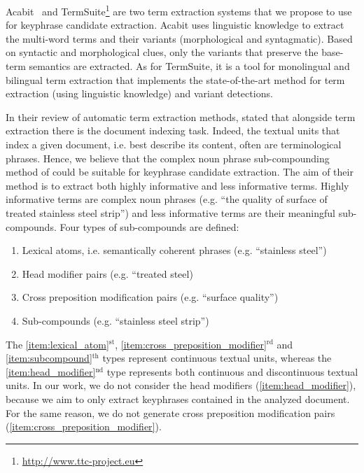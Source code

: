   Acabit~\cite{daille2003acabit} and
  TermSuite\footnote{\url{http://www.ttc-project.eu}} are two term extraction
  systems that we propose to use for keyphrase candidate extraction. Acabit uses
  linguistic knowledge to extract the multi-word terms and their variants
  (morphological and syntagmatic). Based on syntactic and morphological clues,
  only the variants that preserve the base-term semantics are extracted. As for
  TermSuite, it is a tool for monolingual and bilingual term extraction that
  implements the state-of-the-art method for term extraction (using linguistic
  knowledge) and variant detections.

  In their review of automatic term extraction methods,
   stated that alongside term
  extraction there is the document indexing task. Indeed, the textual units that
  index a given document, i.e. best describe its content, often are
  terminological phrases. Hence, we believe that the complex noun phrase
  sub-compounding method of  could be
  suitable for keyphrase candidate extraction. The aim of their method is to
  extract both highly informative and less informative terms. Highly informative
  terms are complex noun phrases (e.g. ``the quality of surface of treated
  stainless steel strip'') and less  informative terms are their meaningful
  sub-compounds. Four types of sub-compounds are defined:
  \begin{enumerate}
    \item{Lexical atoms, i.e. semantically coherent phrases (e.g. ``stainless
          steel'')
          \label{item:lexical_atom}}
    \item{Head modifier pairs (e.g. ``treated steel)
          \label{item:head_modifier}}
    \item{Cross preposition modification pairs (e.g. ``surface quality'')
          \label{item:cross_preposition_modifier}}
    \item{Sub-compounds (e.g. ``stainless steel strip'')
          \label{item:subcompound}}
  \end{enumerate}
  The \ref{item:lexical_atom}$^\text{st}$,
  \ref{item:cross_preposition_modifier}$^\text{rd}$ and
  \ref{item:subcompound}$^\text{th}$ types represent continuous textual units,
  whereas the \ref{item:head_modifier}$^\text{nd}$ type represents both
  continuous and discontinuous textual units. In our work, we do not consider
  the head modifiers (\ref{item:head_modifier}), because we aim to only extract
  keyphrases contained in the analyzed document. For the same reason, we do not
  generate cross preposition modification pairs
  (\ref{item:cross_preposition_modifier}).

